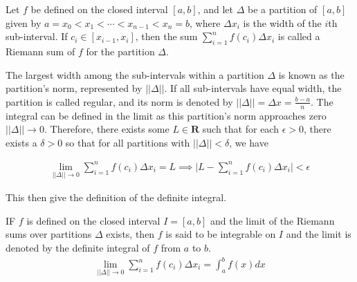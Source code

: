\begin{defn}{1}
Let $f$ be defined on the closed interval $[a,b]$, and let $\Delta$ be a partition of $[a,b]$ given by $a=x_0 < x_1 < \cdots < x_{n-1} < x_n = b$, where $\Delta x_i$ is the width of the $i$th sub-interval. If $c_i \in [x_{i-1},x_i]$, then the sum $\sum_{i=1}^{n}f(c_i)\Delta x_i$ is called a Riemann sum of $f$ for the partition $\Delta$.
\end{defn}

The largest width among the sub-intervals within a partition $\Delta$ is known as the partition's norm, represented by $||\Delta||$. If all sub-intervals have equal width, the partition is called regular, and its norm is denoted by $||\Delta|| = \Delta x = \frac{b-a}{n}$. The integral can be defined in the limit as this partition's norm approaches zero $||\Delta|| \to 0$. Therefore, there exists some $L\in\mathbf{R}$ such that for each $\epsilon > 0$, there exists a $\delta > 0$ so that for all partitions with $||\Delta|| < \delta$, we have

\begin{align}
\lim_{||\Delta|| \to 0}\sum_{i=1}^{n}f(c_i)\Delta x_i = L \implies \bigg|L-\sum_{i=1}^{n}f(c_i)\Delta x_i\bigg| < \epsilon
\end{align}

This then give the definition of the definite integral.

\begin{defn}{1}
IF $f$ is defined on the closed interval $I=[a,b]$ and the limit of the Riemann sums over partitions $\Delta$ exists, then $f$ is said to be integrable on $I$ and the limit is denoted by the definite integral of $f$ from $a$ to $b$. 
\begin{align}
\lim_{||\Delta|| \to 0}\sum_{i=1}^{n}f(c_i)\Delta x_i = \int_a^b f(x)dx
\end{align}
\end{defn}















